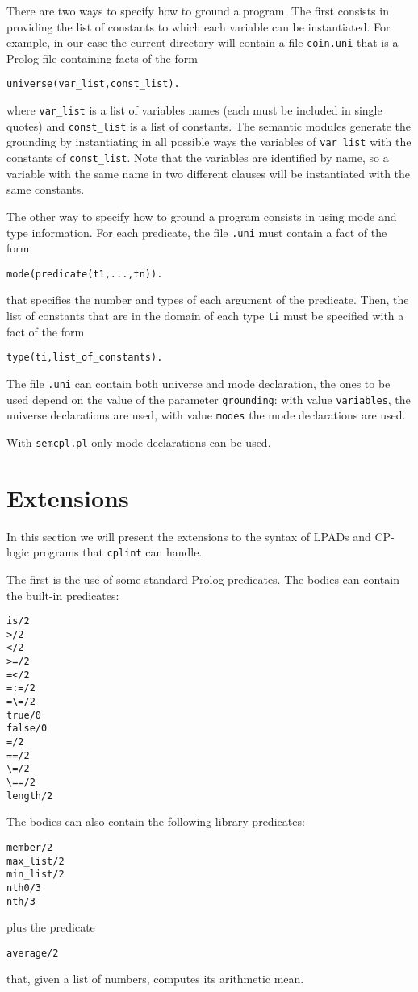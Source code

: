\documentclass[a4paper,12pt]{article}
\begin{document}
There are two ways to specify how to ground a program. The first consists in providing  the list of constants to which each variable can be instantiated. For example, in our case the current directory will contain a file \texttt{coin.uni} that is a Prolog file containing facts of the form
\begin{verbatim}
universe(var_list,const_list).
\end{verbatim}
where \verb|var_list| is a list of variables names (each must be included in single quotes) and \verb|const_list| is a list of constants. The semantic modules generate the grounding by instantiating in all possible ways the variables of \verb|var_list| with the constants of \verb|const_list|. Note that the variables are identified by name, so a variable with the same name in two different clauses will be instantiated with the same constants.

The other way to specify how to ground a program consists in using mode and type information. For each predicate, the file \texttt{.uni} must contain a fact of the form
\begin{verbatim}
mode(predicate(t1,...,tn)).
\end{verbatim}
that specifies the number and types of each argument of the predicate. Then, the list of constants that
are in the domain of each type \texttt{ti} must be specified with a fact of the form
\begin{verbatim}
type(ti,list_of_constants).
\end{verbatim}
The file \texttt{.uni} can contain both universe and mode declaration, the ones to be used depend on the value of the parameter \texttt{grounding}: with value \texttt{variables}, the universe declarations are used, with value \texttt{modes} the mode declarations are used.

With \texttt{semcpl.pl} only mode declarations can be used.



\section{Extensions}
In this section we will present the extensions to the syntax of LPADs and CP-logic programs that \texttt{cplint} can handle.

The first is the use of some standard Prolog predicates.
The bodies can contain the built-in predicates:
\begin{verbatim}
is/2
>/2
</2
>=/2
=</2
=:=/2
=\=/2
true/0
false/0
=/2
==/2
\=/2
\==/2
length/2
\end{verbatim}
The bodies can also contain the following
 library predicates:
\begin{verbatim}
member/2
max_list/2
min_list/2
nth0/3
nth/3
\end{verbatim}
plus the predicate
\begin{verbatim}
average/2
\end{verbatim}
that, given a list of numbers, computes its arithmetic mean.
\end{document}
